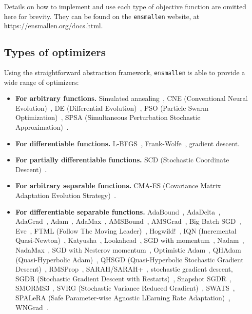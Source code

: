 Details on how to implement and use each type of objective function 
are omitted here for brevity.
They can be found on the {\tt ensmallen} website,
at \mbox{\url{https://ensmallen.org/docs.html}}.

\subsection{Types of optimizers}

Using the straightforward abstraction framework, {\tt ensmallen} is able to
provide a wide range of optimizers:

\begin{itemize}
  \item {\bf For arbitrary functions.}  Simulated
annealing~\cite{kirkpatrick1983optimization}, CNE
(Conventional Neural Evolution)~\cite{montana1989training}, DE (Differential
Evolution)~\cite{storn1997differential}, PSO (Particle Swarm
Optimization)~\cite{Kennedy1995}, SPSA (Simultaneous Perturbation
Stochastic Approximation)~\cite{spall1992multivariate}.

  \item {\bf For differentiable functions.}  L-BFGS~\cite{liu1989limited},
Frank-Wolfe~\cite{jaggi2013revisiting}, gradient descent.

  \item {\bf For partially differentiable functions.}  SCD (Stochastic
Coordinate Descent)~\cite{Shalev-Shwartz2009}.

  \item {\bf For arbitrary separable functions.}  CMA-ES (Covariance Matrix
Adaptation Evolution Strategy)~\cite{Hansen2001}.

  \item {\bf For differentiable separable functions.}
AdaBound~\cite{Luo2019AdaBound},
AdaDelta~\cite{zeiler2012adadelta}, AdaGrad~\cite{duchi2011adaptive},
Adam~\cite{Kingma2014}, AdaMax~\cite{Kingma2014},
AMSBound~\cite{Luo2019AdaBound}, AMSGrad~\cite{reddi2019convergence},
Big Batch SGD~\cite{De2017}, Eve~\cite{Koushik2016}, FTML (Follow The Moving
Leader)~\cite{Zheng2017},
Hogwild!~\cite{recht2011hogwild}, IQN
(Incremental Quasi-Newton)~\cite{1106.5730}, Katyusha~\cite{Allen-Zhu2016},
Lookahead~\cite{Zhang2019}, SGD with momentum~\cite{rumelhart1988learning},
Nadam~\cite{Dozat2015},
NadaMax~\cite{Dozat2015}, SGD with Nesterov momentum~\cite{Nesterov1983},
Optimistic
Adam~\cite{daskalakis2017training}, QHAdam (Quasi-Hyperbolic
Adam)~\cite{ma2019qh}, QHSGD
(Quasi-Hyperbolic Stochastic Gradient Descent)~\cite{ma2019qh},
RMSProp~\cite{tieleman2012lecture},
SARAH/SARAH+~\cite{Nguyen2017}, stochastic gradient descent, SGDR (Stochastic Gradient
Descent with Restarts)~\cite{Loshchilov2016}, Snapshot SGDR~\cite{Huang2017},
SMORMS3~\cite{Funk2015}, SVRG (Stochastic Variance Reduced
Gradient)~\cite{Johnson2013}, SWATS~\cite{Keskar2017},
SPALeRA (Safe Parameter-wise Agnostic LEarning Rate
Adaptation)~\cite{Schoenauer2017},
WNGrad~\cite{Wu2018}.


\end{itemize}
